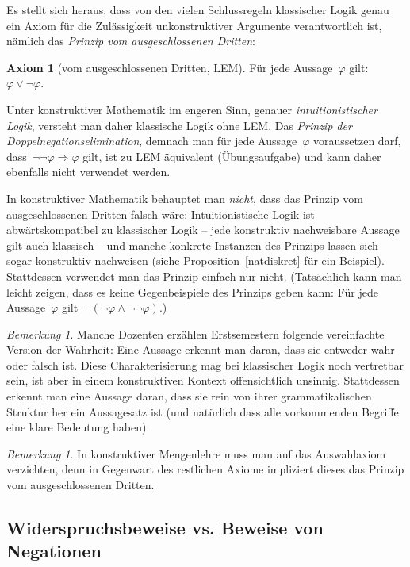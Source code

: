 \documentclass[a4paper,ngerman,12pt]{scrartcl}
\theoremstyle{definition}
\newtheorem{axiom}[defn]{Axiom}
\theoremstyle{plain}
\theoremstyle{remark}
\newtheorem{bem}[defn]{Bemerkung}
\renewcommand{\_}{\mathpunct{.}\,}
\newcommand{\?}{\,{:}\,}
\begin{document}
Es stellt sich heraus, dass von den vielen Schlussregeln klassischer Logik genau
ein Axiom für die Zulässigkeit unkonstruktiver Argumente verantwortlich ist,
nämlich das \emph{Prinzip vom ausgeschlossenen Dritten}:
\begin{axiom}[vom ausgeschlossenen Dritten, LEM]Für jede Aussage~$\varphi$ gilt: $\varphi \vee
\neg\varphi$.\end{axiom}
Unter konstruktiver Mathematik im engeren Sinn, genauer
\emph{intuitionistischer Logik}, versteht man daher klassische Logik ohne LEM.
Das \emph{Prinzip der Doppelnegationselimination}, demnach man für jede
Aussage~$\varphi$ voraussetzen darf, dass~$\neg\neg\varphi \Rightarrow \varphi$
gilt, ist zu LEM äquivalent (Übungsaufgabe) und kann daher ebenfalls nicht
verwendet werden.

In konstruktiver Mathematik behauptet man \emph{nicht}, dass das
Prinzip vom ausgeschlossenen Dritten falsch wäre: Intuitionistische Logik ist
abwärtskompatibel zu klassischer Logik -- jede konstruktiv nachweisbare Aussage
gilt auch klassisch -- und manche konkrete Instanzen des Prinzips lassen sich
sogar konstruktiv nachweisen (siehe Proposition~\ref{natdiskret} für ein Beispiel).
Stattdessen verwendet man das Prinzip einfach
nur nicht. (Tatsächlich kann man leicht zeigen, dass es keine Gegenbeispiele
des Prinzips geben kann: Für jede Aussage~$\varphi$ gilt~$\neg(\neg\varphi
\wedge \neg\neg\varphi)$.)

\begin{bem}Manche Dozenten erzählen Erstsemestern folgende vereinfachte Version
der Wahrheit: Eine Aussage
erkennt man daran, dass sie entweder wahr oder falsch ist. Diese
Charakterisierung mag bei klassischer Logik noch vertretbar sein, ist aber in
einem konstruktiven Kontext offensichtlich unsinnig. Stattdessen erkennt man
eine Aussage daran, dass sie rein von ihrer grammatikalischen Struktur her ein
Aussagesatz ist (und natürlich dass alle vorkommenden Begriffe eine klare
Bedeutung haben).\end{bem}

\begin{bem}In konstruktiver Mengenlehre muss man auf das Auswahlaxiom
verzichten, denn in Gegenwart des restlichen Axiome impliziert dieses das
Prinzip vom ausgeschlossenen Dritten.\end{bem}


\subsection{Widerspruchsbeweise vs. Beweise von Negationen}
\label{widerspruchvsnegation}
\end{document}
